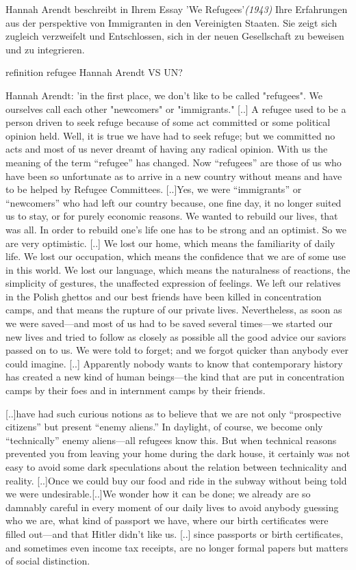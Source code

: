 Hannah Arendt beschreibt in Ihrem Essay 'We Refugees'\textit{(1943)} Ihre Erfahrungen aus der perspektive von Immigranten in den Vereinigten Staaten. Sie zeigt sich zugleich verzweifelt und Entschlossen, sich in der neuen Gesellschaft zu beweisen und zu integrieren.\newline



refinition refugee Hannah Arendt VS UN?

Hannah Arendt: 'in the first place, we don't like to be called "refugees". We ourselves call each other "newcomers" or "immigrants." [..] A refugee used to be a person driven to seek refuge because of some act committed or some political opinion held. Well, it is true we have had to seek refuge; but we committed no acts and most of us never dreamt of having any radical opinion. With us the meaning of the term “refugee” has changed. Now “refugees” are those of us who have been so unfortunate as to arrive in a new country without means and have to be helped by Refugee Committees.
[..]Yes, we were “immigrants” or “newcomers” who had left our country because, one fine day, it no longer suited us to stay, or for purely economic reasons. We wanted to rebuild our lives, that was all. In order to rebuild one’s life one has to be strong and an optimist. So we are very optimistic. [..]
We lost our home, which means the familiarity of daily life. We lost our occupation, which means the confidence that we are of some use in this world. We lost our language, which means the naturalness of reactions, the simplicity of gestures, the unaffected expression of feelings. We left our relatives in the Polish ghettos and our best friends have been killed in concentration camps, and that means the rupture of our private lives.
Nevertheless, as soon as we were saved—and most of us had to be saved several times—we started our new lives and tried to follow as closely as possible all the good advice our saviors passed on to us. We were told to forget; and we forgot quicker than anybody ever could imagine.
[..] Apparently nobody wants to know that contemporary history has created a new kind of human beings—the kind that are put in concentration camps by their foes and in internment camps by their friends.

[..]have had such curious notions as to believe that we are not only “prospective citizens” but present “enemy aliens.” In daylight, of course, we become only “technically” enemy aliens—all refugees know this. But when technical reasons prevented you from leaving your home during the dark house, it certainly was not easy to avoid some dark speculations about the relation between technicality and reality.
[..]Once we could buy our food and ride in the subway without being told we were undesirable.[..]We wonder how it can be done; we already are so damnably careful in every moment of our daily lives to avoid anybody guessing who we are, what kind of passport we have, where our birth certificates were filled out—and that Hitler didn’t like us. 
[..] since passports or birth certificates, and sometimes even income tax receipts, are no longer formal papers but matters of social distinction.

